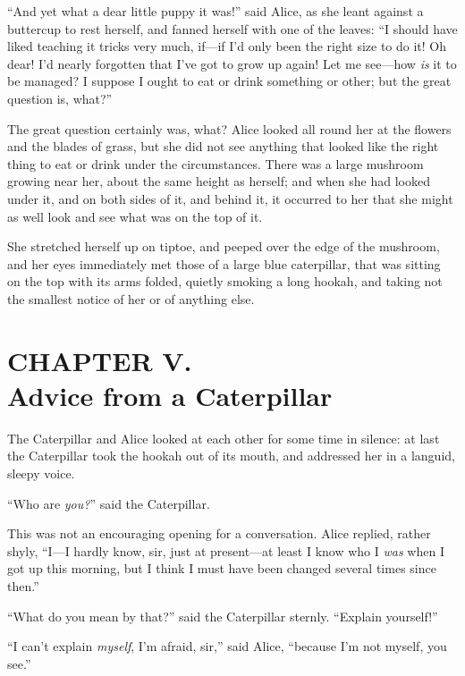 \documentclass[11pt,openany,oneside]{book}
\begin{document}
“And yet what a dear little puppy it was!” said Alice, as she leant against a buttercup to rest herself, and fanned herself with one of the leaves: “I should have liked teaching it tricks very much, if—if I’d only been the right size to do it! Oh dear! I’d nearly forgotten that I’ve got to grow up again! Let me see—how {\em is\/} it to be managed? I suppose I ought to eat or drink something or other; but the great question is, what?” 

The great question certainly was, what? Alice looked all round her at the flowers and the blades of grass, but she did not see anything that looked like the right thing to eat or drink under the circumstances. There was a large mushroom growing near her, about the same height as herself; and when she had looked under it, and on both sides of it, and behind it, it occurred to her that she might as well look and see what was on the top of it. 

She stretched herself up on tiptoe, and peeped over the edge of the mushroom, and her eyes immediately met those of a large blue caterpillar, that was sitting on the top with its arms folded, quietly smoking a long hookah, and taking not the smallest notice of her or of anything else. 


\clearpage{}
{}
\chapter*{CHAPTER V.\\  Advice from a Caterpillar}
\leavevmode\hypertarget{d8.fp63138}{}The Caterpillar and Alice looked at each other for some time in silence: at last the Caterpillar took the hookah out of its mouth, and addressed her in a languid, sleepy voice. 

“Who are {\em you?\/}” said the Caterpillar. 

This was not an encouraging opening for a conversation. Alice replied, rather shyly, “I—I hardly know, sir, just at present—at least I know who I {\em was\/} when I got up this morning, but I think I must have been changed several times since then.” 

“What do you mean by that?” said the Caterpillar sternly. “Explain yourself!” 

“I can’t explain {\em myself\/}, I’m afraid, sir,” said Alice, “because I’m not myself, you see.” 
\end{document}
